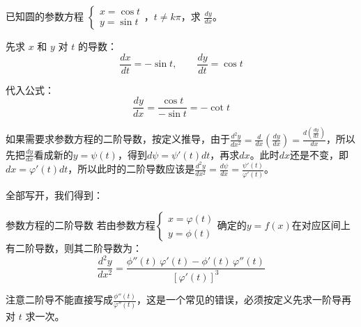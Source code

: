 \begin{myexample}
  已知圆的参数方程 \(\begin{cases}
x = \cos t \\
y = \sin t
\end{cases}\)，$t \neq k\pi$，求 $\frac{dy}{dx}$。

  先求 $x$ 和 $y$ 对 $t$ 的导数：
  \[
  \frac{dx}{dt} = -\sin t, \qquad \frac{dy}{dt} = \cos t
  \]

  代入公式：
  \[
  \frac{dy}{dx} = \frac{\cos t}{-\sin t} = -\cot t
  \]

\end{myexample}

如果需要求参数方程的二阶导数，按定义推导，由于\(
\frac{d^2y}{dx^2} = \frac{d}{dx} (\frac{dy}{dx}) = \frac{d(\frac{dy}{dx})}{dx}\)，所以先把$\frac{dy}{dx}$看成新的$y=\psi (t)$，得到$d\psi =\psi' (t) dt$，再求$dx$。此时$dx$还是不变，即$dx=\varphi' (t)dt$，所以此时的二阶导数应该是$\frac{d^2y}{dx^2} = \frac{d\psi }{dx} = \frac{\psi' (t)}{\varphi' (t)}$。

全部写开，我们得到：

\begin{theorem}{参数方程的二阶导数}{}
    若由参数方程\(\begin{cases}
x = \varphi (t) \\
y = \phi (t)
\end{cases}\)确定的$y=f(x)$在对应区间上有二阶导数，则其二阶导数为：
\[
\frac{d^2y}{dx^2} = \frac{\phi''(t)\,\varphi'(t) - \phi'(t)\,\varphi''(t)}{[\varphi'(t)]^3}
\]
\end{theorem}

注意二阶导不能直接写成$\frac{\phi ''(t)}{\varphi ''(t)}$，这是一个常见的错误，必须按定义先求一阶导再对 $t$ 求一次。

